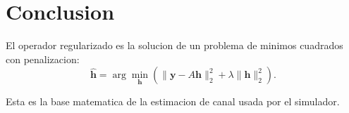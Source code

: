 \documentclass[11pt]{article}
\begin{document}
\section{Conclusion}

El operador regularizado es la solucion de un problema de minimos cuadrados con
penalizacion:
\[
    \hat{\bm h}
    =
    \arg\min_{\bm h}
    \left(
        \|\bm y - A\bm h\|_2^2
        +
        \lambda\|\bm h\|_2^2
    \right).
\]

Esta es la base matematica de la estimacion de canal usada por el simulador.
\end{document}

